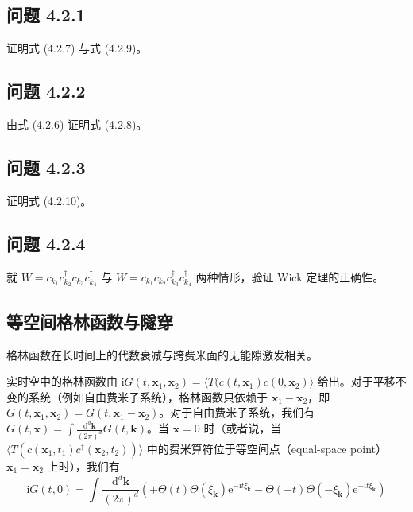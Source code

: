 \subsection*{问题 4.2.1}

证明式 (4.2.7) 与式 (4.2.9)。

\subsection*{问题 4.2.2}

由式 (4.2.6) 证明式 (4.2.8)。

\subsection*{问题 4.2.3}

证明式 (4.2.10)。

\subsection*{问题 4.2.4}

就 $W = c_{k_{1}}c_{k_{2}}^{\dagger}c_{k_{3}}c_{k_{4}}^{\dagger}$ 与 $W = c_{k_{1}}c_{k_{2}}c_{k_{3}}^{\dagger}c_{k_{4}}^{\dagger}$ 两种情形，验证 Wick 定理的正确性。

\subsection{等空间格林函数与隧穿}

\begin{keypoints}
\item 格林函数在长时间上的代数衰减与跨费米面的无能隙激发相关。
\end{keypoints}

实时空中的格林函数由 $\mathrm{i}G(t, \pmb{x}_{1}, \pmb{x}_{2}) = \langle T(c(t, \pmb{x}_{1})c(0, \pmb{x}_{2})\rangle$ 给出。对于平移不变的系统（例如自由费米子系统），格林函数只依赖于 $\pmb{x}_{1} - \pmb{x}_{2}$，即 $G(t, \pmb{x}_{1}, \pmb{x}_{2}) = G(t, \pmb{x}_{1} - \pmb{x}_{2})$。对于自由费米子系统，我们有 $G(t, \pmb{x}) = \int \frac{\mathrm{d}^{d}\pmb{k}}{(2\pi)^{d}}G(t, \pmb{k})$。当 $\pmb{x} = 0$ 时（或者说，当 $\langle T(c(\pmb{x}_{1}, t_{1})c^{\dagger}(\pmb{x}_{2}, t_{2}))\rangle$ 中的费米算符位于等空间点（equal-space point）$\pmb{x}_{1} = \pmb{x}_{2}$ 上时），我们有
\begin{equation*}
\mathrm{i}G(t, 0) = \int \frac{\mathrm{d}^{d}\pmb{k}}{(2\pi)^{d}}\left(+\Theta(t)\Theta(\xi_{\pmb{k}})\mathrm{e}^{-\mathrm{i}t\xi_{\pmb{k}}} - \Theta(-t)\Theta(-\xi_{\pmb{k}})\mathrm{e}^{-\mathrm{i}t\xi_{\pmb{k}}}\right)
\end{equation*}

